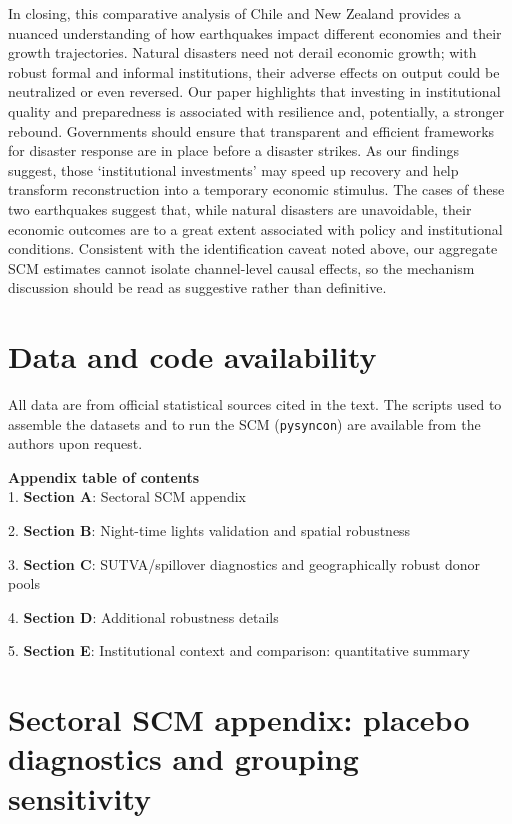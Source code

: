 \documentclass[12pt]{article}
\begin{document}
In closing, this comparative analysis of Chile and New Zealand provides a nuanced understanding of how earthquakes impact different economies and their growth trajectories. Natural disasters need not derail economic growth; with robust formal and informal institutions, their adverse effects on output could be neutralized or even reversed. Our paper highlights that investing in institutional quality and preparedness is associated with resilience and, potentially, a stronger rebound. Governments should ensure that transparent and efficient frameworks for disaster response are in place before a disaster strikes. As our findings suggest, those ‘institutional investments’ may speed up recovery and help transform reconstruction into a temporary economic stimulus. The cases of these two earthquakes suggest that, while natural disasters are unavoidable, their economic outcomes are to a great extent associated with policy and institutional conditions. Consistent with the identification caveat noted above, our aggregate SCM estimates cannot isolate channel-level causal effects, so the mechanism discussion should be read as suggestive rather than definitive.

\newpage

\printbibliography
\section*{Data and code availability}
All data are from official statistical sources cited in the text. The scripts used to assemble the datasets and to run the SCM (\texttt{pysyncon}) are available from the authors upon request.

\newpage

\textbf{Appendix table of contents}\\


1. \textbf{Section A}: Sectoral SCM appendix

2. \textbf{Section B}: Night-time lights validation and spatial robustness

3. \textbf{Section C}: SUTVA/spillover diagnostics and geographically robust donor pools

4. \textbf{Section D}: Additional robustness details 

5. \textbf{Section E}: Institutional context and comparison: quantitative summary 


\newpage
\appendix
\section{Sectoral SCM appendix: placebo diagnostics and grouping sensitivity}
\end{document}
